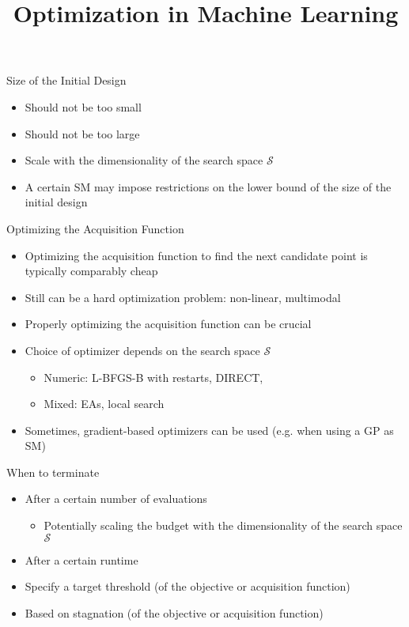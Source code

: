 \documentclass[11pt,compress,t,notes=noshow, xcolor=table]{beamer}
\title{Optimization in Machine Learning}
\date{}
\begin{document}

\begin{frame}{Size of the Initial Design}
  \begin{itemize}
    \item Should not be too small
    \item Should not be too large
    \item Scale with the dimensionality of the search space $\mathcal{S}$
    \item A certain SM may impose restrictions on the lower bound of the size of the initial design
  \end{itemize}
\end{frame}

\begin{frame}{Optimizing the Acquisition Function}
  \begin{itemize}
    \item Optimizing the acquisition function to find the next candidate point is typically comparably cheap
    \item Still can be a hard optimization problem: non-linear, multimodal
    \item Properly optimizing the acquisition function can be crucial
    \item Choice of optimizer depends on the search space $\mathcal{S}$
      \begin{itemize}
        \item Numeric: L-BFGS-B with restarts, DIRECT,
        \item Mixed: EAs, local search
      \end{itemize}
    \item Sometimes, gradient-based optimizers can be used (e.g. when using a GP as SM)
  \end{itemize}
\end{frame}

\begin{frame}{When to terminate}
  \begin{itemize}
    \item After a certain number of evaluations
      \begin{itemize}
        \item Potentially scaling the budget with the dimensionality of the search space $\mathcal{S}$
       \end{itemize}
    \item After a certain runtime
    \item Specify a target threshold (of the objective or acquisition function)
    \item Based on stagnation (of the objective or acquisition function)
  \end{itemize}
\end{frame}

\endlecture
\end{document}
